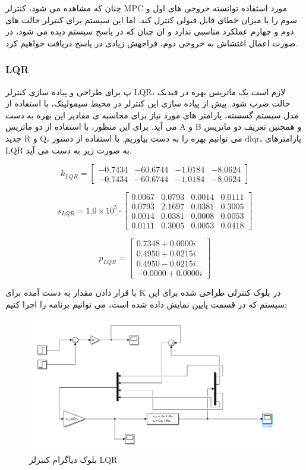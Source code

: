  چنان که مشاهده می شود، کنترلر MPC مورد استفاده توانسته خروجی های اول و سوم را با میزان خطای قابل قبولی کنترل کند. اما این سیستم برای کنترلر حالت های دوم و چهارم عملکرد مناسبی ندارد و ان چنان که در پاسخ سیستم دیده می شود، در صورت اعمال اغتشاش به خروجی دوم، فراجهش زیادی در پاسخ دریافت خواهیم کرد.
 
 \subsubsection{LQR}
 پ
 برای طراحی و پیاده سازی کنترلر LQR، لازم است یک ماتریس بهره در فیدبک حالت ضرب شود. پیش از پیاده سازی این کنترلر در محیط سیمولینک، با استفاده از مدل سیستم گسسته، پارامتر های مورد نیاز برای محاسبه ی مقادیر این بهره به دست می آید. برای این منظور، با استفاده از دو ماتریس A و B و همچنین تعریف دو ماتریس جدید R و Q، می توانیم بهره را به دست بیاوریم. 
 با استفاده از دستور dlqr، پارامترهای LQR به صورت زیر به دست می آید.
 
\[
k_{LQR} = 
\begin{bmatrix}
	-0.7434 & -60.6744 & -1.0184 & -8.0624 \\
	-0.7434 & -60.6744 & -1.0184 & -8.0624
\end{bmatrix}
\]

\[
s_{LQR} = 
1.0 \times 10^{5} \cdot
\begin{bmatrix}
	0.0067 & 0.0793 & 0.0014 & 0.0111 \\
	0.0793 & 2.1697 & 0.0381 & 0.3005 \\
	0.0014 & 0.0381 & 0.0008 & 0.0053 \\
	0.0111 & 0.3005 & 0.0053 & 0.0418
\end{bmatrix}
\]

\[
p_{LQR} = 
\begin{bmatrix}
	0.7348 + 0.0000i \\
	0.4950 + 0.0215i \\
	0.4950 - 0.0215i \\
	-0.0000 + 0.0000i
\end{bmatrix}
\]

 
 با قرار دادن مقدار به دست آمده برای K در بلوک کنترلی طراحی شده برای این سیستم که در قسمت پایین نمایش داده شده است، می توانیم برنامه را اجرا کنیم:
 
 \begin{figure}[H]
 	\centering
 	\includegraphics[width=1\linewidth]{../img/Q3_LQR_Block}
 	\caption{بلوک دیاگرام کنترلر LQR}
 	\label{fig:q3lqrblock}
 \end{figure}
 
